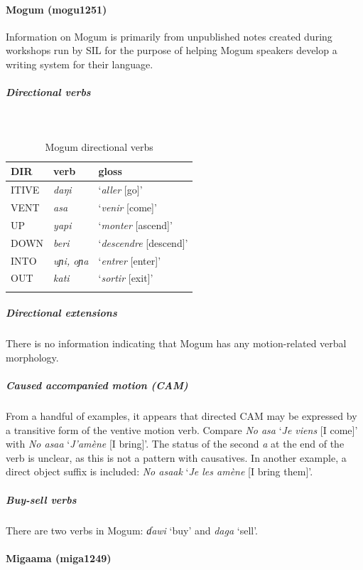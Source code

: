 \paragraph*{Mogum (mogu1251)}

Information on Mogum is primarily from unpublished notes created during workshops run by SIL for the purpose of helping Mogum speakers develop a writing system for their language. 

\newpage
\subparagraph{Directional verbs}~

\begin{table}[H]
	\caption{Mogum directional verbs} 
	\label{tab:moguV}
	\begin{tabular}{lll} %
		\lsptoprule
		DIR & verb & gloss   \\ %
		\midrule
		ITIVE & \textit{daŋi} & `\textit{aller} [go]' \\
		VENT & \textit{asa} & `\textit{venir} [come]' \\
		UP & \textit{yapi} & `\textit{monter} [ascend]' \\
		DOWN & \textit{beri} & `\textit{descendre} [descend]' \\
		INTO& \textit{uɲi, oɲa} & `\textit{entrer} [enter]' \\
		OUT & \textit{kati} & `\textit{sortir} [exit]' \\
		\lspbottomrule
	\end{tabular}
\end{table}

\subparagraph{Directional extensions}

There is no information indicating that Mogum has any motion-related verbal morphology.

\subparagraph{Caused accompanied motion (CAM)}

From a handful of examples, it appears that directed CAM may be expressed by a transitive form of the ventive motion verb. Compare \textit{No asa} `\textit{Je viens} [I come]' with \textit{No asaa} `\textit{J'amène} [I bring]'. The status of the second \textit{a} at the end of the verb is unclear, as this is not a pattern with causatives. In another example, a direct object suffix is included: \textit{No asaak} `\textit{Je les amène} [I bring them]'. 

\subparagraph{Buy-sell verbs}

There are two verbs in Mogum: \textit{ɗawi} `buy' and \textit{daga} `sell'. 

\paragraph*{Migaama (miga1249)} \label{miga}

